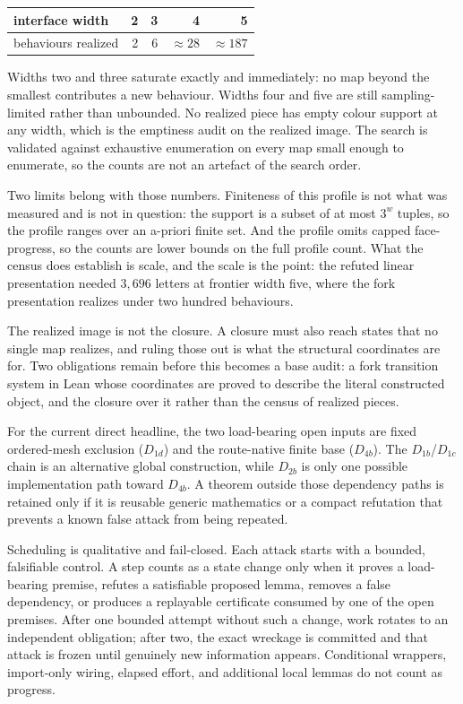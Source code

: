\begin{center}
\small
\begin{tabular}{@{}lrrrr@{}}
\toprule
interface width & 2 & 3 & 4 & 5\\
\midrule
behaviours realized & 2 & 6 & $\approx 28$ & $\approx 187$\\
\bottomrule
\end{tabular}
\end{center}

Widths two and three saturate exactly and immediately: no map beyond the
smallest contributes a new behaviour.  Widths four and five are still
sampling-limited rather than unbounded.  No realized piece has empty colour
support at any width, which is the emptiness audit on the realized image.  The
search is validated against exhaustive enumeration on every map small enough
to enumerate, so the counts are not an artefact of the search order.

Two limits belong with those numbers.  Finiteness of this profile is not what
was measured and is not in question: the support is a subset of at most $3^{w}$
tuples, so the profile ranges over an a-priori finite set.  And the profile
omits capped face-progress, so the counts are lower bounds on the full profile
count.  What the census does establish is scale, and the scale is the point:
the refuted linear presentation needed $3{,}696$ letters at frontier width
five, where the fork presentation realizes under two hundred behaviours.

The realized image is not the closure.  A closure must also reach states that
no single map realizes, and ruling those out is what the structural
coordinates are for.  Two obligations remain before this becomes a base audit:
a fork transition system in Lean whose coordinates are proved to describe the
literal constructed object, and the closure over it rather than the census of
realized pieces.

For the current direct headline, the two load-bearing open inputs are fixed
ordered-mesh exclusion ($D_{1d}$) and the route-native finite base ($D_{4b}$).
The $D_{1b}$/$D_{1c}$ chain is an alternative global construction, while
$D_{2b}$ is only one possible implementation path toward $D_{4b}$.  A theorem
outside those dependency paths is retained only if it is reusable generic
mathematics or a compact refutation that prevents a known false attack from
being repeated.

Scheduling is qualitative and fail-closed.  Each attack starts with a bounded,
falsifiable control.  A step counts as a state change only when it proves a
load-bearing premise, refutes a satisfiable proposed lemma, removes a false
dependency, or produces a replayable certificate consumed by one of the open
premises.  After one bounded attempt without such a change, work rotates to an
independent obligation; after two, the exact wreckage is committed and that
attack is frozen until genuinely new information appears.  Conditional
wrappers, import-only wiring, elapsed effort, and additional local lemmas do
not count as progress.

